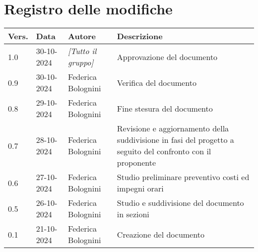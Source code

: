 \section*{Registro delle modifiche}

\begin{table}[h]
    \centering
    \begin{tabular}{|l|l|l|p{5cm}|}
        \hline
        \rowcolor[gray]{0.9}
        \textbf{Vers.} & \textbf{Data} & \textbf{Autore} & \textbf{Descrizione}\\
        \hline
        1.0 & 30-10-2024 & \emph{[Tutto il gruppo]} & Approvazione del documento\\
        \hline
        0.9 & 30-10-2024 & Federica Bolognini & Verifica del documento\\
        \hline
        0.8 & 29-10-2024 & Federica Bolognini & Fine stesura del documento\\
        \hline
        0.7 & 28-10-2024 & Federica Bolognini & Revisione e aggiornamento della suddivisione in fasi del progetto a seguito del confronto con il proponente\\
        \hline
        0.6 & 27-10-2024 & Federica Bolognini & Studio preliminare preventivo costi ed impegni orari\\
        \hline
        0.5 & 26-10-2024 & Federica Bolognini & Studio e suddivisione del documento in sezioni\\
        \hline
        0.1 & 21-10-2024 & Federica Bolognini & Creazione del documento\\
        \hline
    \end{tabular}
\end{table}
